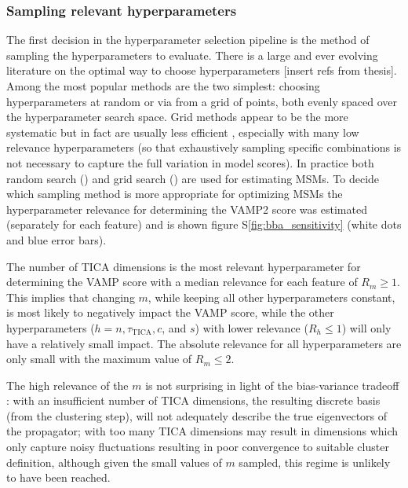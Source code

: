 \documentclass[journal=jacsat,manuscript=article]{achemso}
\newcommand*\sref[1]{%
    S\ref{#1}}
\begin{document}
\subsubsection{Sampling relevant hyperparameters}
The first decision in the hyperparameter selection pipeline is the method of sampling the hyperparameters to evaluate.  There is a large and ever evolving literature on the optimal way to choose hyperparameters [insert refs from thesis]. Among the most popular methods are the two simplest: choosing hyperparameters at random or via from a grid of points, both evenly spaced over the hyperparameter search space. Grid methods appear to be the more systematic but in fact are usually less efficient \cite{bergstrajamesbergstraRandomSearchHyperParameter2012}, especially with many low relevance hyperparameters (so that exhaustively sampling specific combinations is not necessary to capture the full variation in model scores).  In practice both random search (\cite{Optimized_2016}) and grid search (\cite{chen_dynamic_2019}) are used for estimating MSMs. To decide which sampling method is more appropriate for optimizing MSMs the hyperparameter relevance for determining the VAMP2 score was estimated (separately for each feature) and is shown figure \sref{fig:bba_sensitivity} (white dots and blue error bars). 

The number of TICA dimensions is the most relevant hyperparameter for determining the VAMP score with a median relevance for each feature of $R_{m}\ge 1$. This implies that changing $m$, while keeping all other hyperparameters constant, is most likely to negatively impact the VAMP score, while the other hyperparameters ($h=n, \tau_{\mathrm{TICA}}, c$, and $s$) with lower relevance ($R_{h} \le 1$) will only have a relatively small impact. The absolute relevance for all hyperparameters are only small with the maximum value of $R_{m} \le 2$.  

The high relevance of the $m$ is not surprising in light of the bias-variance tradeoff \cite{friedman2001elements}: with an insufficient number of TICA dimensions, the resulting discrete basis (from the clustering step), will not adequately describe the true eigenvectors of the propagator; with too many TICA dimensions may result in dimensions which only capture noisy fluctuations resulting in poor convergence to suitable cluster definition, although given the small values of $m$ sampled, this regime is unlikely to have been reached. 
\end{document}
